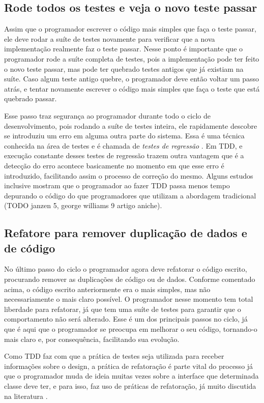 \subsection{Rode todos os testes e veja o novo teste passar}

Assim que o programador escrever o código mais simples que faça o teste passar, ele deve rodar a suíte de testes novamente
para verificar que a nova implementação realmente faz o teste passar. Nesse ponto é importante que o programador rode a suíte 
completa de testes, pois a implementação pode ter feito o novo teste passar, mas pode ter quebrado testes antigos que já existiam na suíte. 
Caso algum teste antigo quebre, o programador deve então voltar um passo atrás, e tentar novamente escrever o código mais simples
que faça o teste que está quebrado passar.

Esse passo traz segurança ao programador durante todo o ciclo de desenvolvimento, pois rodando a suíte de testes inteira, 
ele rapidamente descobre se introduziu um erro em alguma outra parte do sistema. Essa é uma técnica conhecida na área de testes e é
chamada de \textit{testes de regressão} \cite{art-of-sw-testing}. Em TDD, e execução constante desses testes de regressão 
trazem outra vantagem que é a detecção do erro acontece basicamente no momento em que esse erro é introduzido, facilitando assim
o processo de correção do mesmo. Alguns estudos inclusive mostram que o programador ao fazer TDD passa menos tempo depurando o código
do que programadores que utilizam a abordagem tradicional (TODO janzen 5, george williams 9 artigo aniche).

\subsection{Refatore para remover duplicação de dados e de código}

No último passo do ciclo o programador agora deve refatorar o código escrito, procurando remover as duplicações de código ou de dados. 
Conforme comentado acima, o código escrito anteriormente era o mais simples, mas não necessariamente o mais claro possível. O programador
nesse momento tem total liberdade para refatorar, já que tem uma suíte de testes para garantir que o comportamento não será alterado.
Esse é um dos principais passos no ciclo, já que é aqui que o programador se preocupa em melhorar o seu código, tornando-o
mais claro e, por consequência, facilitando sua evolução.

Como TDD faz com que a prática de testes seja utilizada para receber informações sobre o design, 
a prática de refatoração é parte vital do processo já que o programador muda de ideia muitas vezes sobre a interface que determinada
classe deve ter, e para isso, faz uso de práticas de refatoração, já muito discutida na literatura \cite{fowler-refactoring} \cite{joshua-refactoring}.

